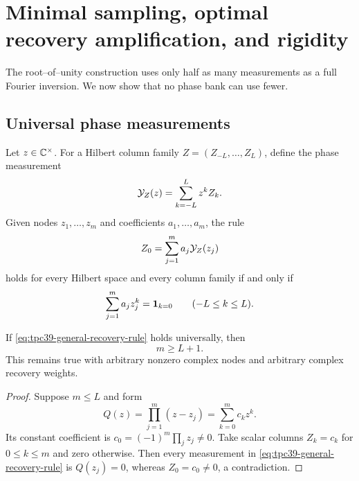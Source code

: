 \section{Minimal sampling, optimal recovery amplification, and rigidity}
\label{sec:tpc39-minimality}

The root--of--unity construction uses only half as many measurements as a
full Fourier inversion.  We now show that no phase bank can use fewer.

\subsection{Universal phase measurements}

Let \(z\in\mathbb C^\times\).  For a Hilbert column family
\(Z=(Z_{-L},\ldots,Z_L)\), define the phase measurement
\begin{equation}
 \mathcal Y_Z(z)=\sum_{k=-L}^{L}z^kZ_k.
 \label{eq:tpc39-general-phase-measurement}
\end{equation}
Given nodes \(z_1,\ldots,z_m\) and coefficients
\(a_1,\ldots,a_m\), the rule
\begin{equation}
 Z_0=\sum_{j=1}^{m}a_j\mathcal Y_Z(z_j)
 \label{eq:tpc39-general-recovery-rule}
\end{equation}
holds for every Hilbert space and every column family if and only if
\begin{equation}
 \sum_{j=1}^{m}a_jz_j^k=\mathbf 1_{k=0}
 \qquad(-L\le k\le L).
 \label{eq:tpc39-moment-system}
\end{equation}

\begin{theorem}
\label{thm:tpc39-minimal-phase-count}
If \eqref{eq:tpc39-general-recovery-rule} holds universally, then
\begin{equation}
 \boxed{m\ge L+1.}
 \label{eq:tpc39-minimal-phase-count}
\end{equation}
This remains true with arbitrary nonzero complex nodes and arbitrary
complex recovery weights.
\end{theorem}

\begin{proof}
Suppose \(m\le L\) and form
\begin{equation}
 Q(z)=\prod_{j=1}^{m}(z-z_j)
 =\sum_{k=0}^{m}c_kz^k.
 \label{eq:tpc39-annihilating-polynomial}
\end{equation}
Its constant coefficient is
\(c_0=(-1)^m\prod_jz_j\ne0\).  Take scalar columns
\(Z_k=c_k\) for \(0\le k\le m\) and zero otherwise.  Then every
measurement in \eqref{eq:tpc39-general-recovery-rule} is \(Q(z_j)=0\),
whereas \(Z_0=c_0\ne0\), a contradiction.
\end{proof}

